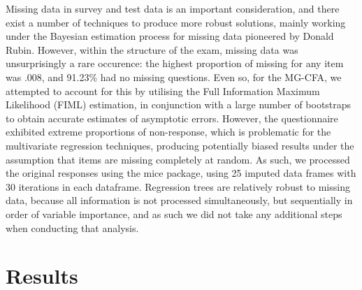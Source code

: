 \documentclass{article}\usepackage[]{graphicx}\usepackage[]{color}
\begin{document}
Missing data in survey and test data is an important consideration, and there exist a number of techniques to produce more robust solutions, mainly working under the Bayesian estimation process for missing data pioneered by Donald Rubin\cite{rubin}. However, within the structure of the exam, missing data was unsurprisingly a rare occurence: the highest proportion of missing for any item was .008, and 91.23\% had no missing questions. Even so, for the MG-CFA, we attempted to account for this by utilising the Full Information Maximum Likelihood (FIML) estimation, in conjunction with a large number of bootstraps to obtain accurate estimates of asymptotic errors. However, the questionnaire exhibited extreme proportions of non-response, which is problematic for the multivariate regression techniques, producing potentially biased results under the assumption that items are missing completely at random. As such, we processed the original responses using the mice package\cite{mice}, using 25 imputed data frames with 30 iterations in each dataframe. Regression trees are relatively robust to missing data, because all information is not processed simultaneously, but sequentially in order of variable importance, and as such we did not take any additional steps when conducting that analysis.
\section{Results}
\end{document}
